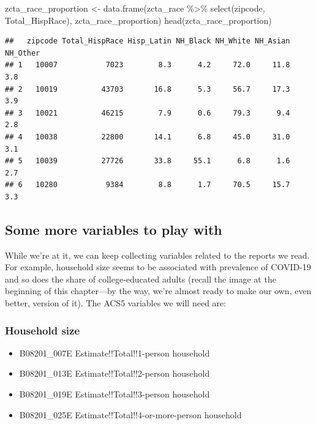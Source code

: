 \documentclass[
  openany]{book}
\newenvironment{Shaded}{\begin{snugshade}}{\end{snugshade}}
\newcommand{\FunctionTok}[1]{\textcolor[rgb]{0.00,0.00,0.00}{#1}}
\newcommand{\NormalTok}[1]{#1}
\newcommand{\OtherTok}[1]{\textcolor[rgb]{0.56,0.35,0.01}{#1}}
\newcommand{\SpecialCharTok}[1]{\textcolor[rgb]{0.00,0.00,0.00}{#1}}
\providecommand{\tightlist}{%
  \setlength{\itemsep}{0pt}\setlength{\parskip}{0pt}}
\begin{document}
\begin{Shaded}
\begin{Highlighting}[]
\NormalTok{zcta\_race\_proportion }\OtherTok{\textless{}{-}} \FunctionTok{data.frame}\NormalTok{(zcta\_race }\SpecialCharTok{\%\textgreater{}\%} \FunctionTok{select}\NormalTok{(zipcode, Total\_HispRace),}
\NormalTok{                              zcta\_race\_proportion) }
\FunctionTok{head}\NormalTok{(zcta\_race\_proportion)}
\end{Highlighting}
\end{Shaded}

\begin{verbatim}
##   zipcode Total_HispRace Hisp_Latin NH_Black NH_White NH_Asian NH_Other
## 1   10007           7023        8.3      4.2     72.0     11.8      3.8
## 2   10019          43703       16.8      5.3     56.7     17.3      3.9
## 3   10021          46215        7.9      0.6     79.3      9.4      2.8
## 4   10038          22800       14.1      6.8     45.0     31.0      3.1
## 5   10039          27726       33.8     55.1      6.8      1.6      2.7
## 6   10280           9384        8.8      1.7     70.5     15.7      3.3
\end{verbatim}

\hypertarget{some-more-variables-to-play-with}{%
\subsection*{Some more variables to play with}\label{some-more-variables-to-play-with}}

While we're at it, we can keep collecting variables related to the reports we read. For example, household size seems to be associated with prevalence of COVID-19 and so does the share of college-educated adults (recall the image at the beginning of this chapter---by the way, we're almost ready to make our own, even better, version of it). The ACS5 variables we will need are:

\hypertarget{household-size}{%
\subsubsection*{Household size}\label{household-size}}

\begin{itemize}
\tightlist
\item
  B08201\_007E Estimate!!Total!!1-person household
\item
  B08201\_013E Estimate!!Total!!2-person household
\item
  B08201\_019E Estimate!!Total!!3-person household
\item
  B08201\_025E Estimate!!Total!!4-or-more-person household
\end{itemize}
\end{document}
